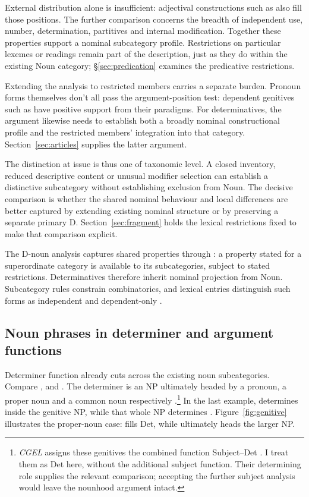 \documentclass[12pt]{article}
\begin{document}
External distribution alone is insufficient: adjectival constructions such as  also fill those positions. The further comparison concerns the breadth of independent use, number, determination, partitives and internal modification. Together these properties support a nominal subcategory profile. Restrictions on particular lexemes or readings remain part of the description, just as they do within the existing Noun category; §\ref{sec:predication} examines the predicative restrictions.

Extending the analysis to restricted members carries a separate burden. Pronoun forms themselves don't all pass the argument-position test: dependent genitives such as  have positive support from their paradigms. For determinatives, the argument likewise needs to establish both a broadly nominal constructional profile and the restricted members' integration into that category. Section~\ref{sec:articles} supplies the latter argument.

The distinction at issue is thus one of taxonomic level. A closed inventory, reduced descriptive content or unusual modifier selection can establish a distinctive subcategory without establishing exclusion from Noun. The decisive comparison is whether the shared nominal behaviour and local differences are better captured by extending existing nominal structure or by preserving a separate primary D. Section~\ref{sec:fragment} holds the lexical restrictions fixed to make that comparison explicit.

The D-noun analysis captures shared properties through : a property stated for a superordinate category is available to its subcategories, subject to stated restrictions. Determinatives therefore inherit nominal projection from Noun. Subcategory rules constrain combinatorics, and lexical entries distinguish such forms as independent  and dependent-only .

\subsection{Noun phrases in determiner and argument functions}\label{sec:bridge}

Determiner function already cuts across the existing noun subcategories. Compare ,  and . The determiner is an NP ultimately headed by a pronoun, a proper noun and a common noun respectively \citep[354--355, 470--471]{huddleston2002}.\footnote{\textit{CGEL} assigns these genitives the combined function Subject--Det \citep[472--473]{huddleston2002}. I treat them as Det here, without the additional subject function. Their determining role supplies the relevant comparison; accepting the further subject analysis would leave the nounhood argument intact.} In the last example,  determines  inside the genitive NP, while that whole NP determines . Figure~\ref{fig:genitive} illustrates the proper-noun case:  fills Det, while  ultimately heads the larger NP.
\end{document}
